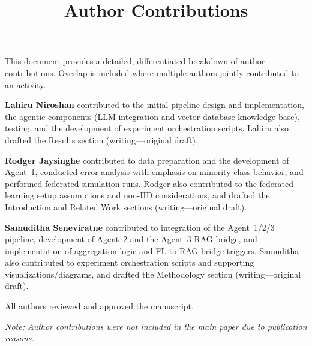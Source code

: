 \documentclass[11pt]{article}
\title{Author Contributions}
\date{}
\begin{document}
\maketitle

This document provides a detailed, differentiated breakdown of author contributions. Overlap is included where multiple authors jointly contributed to an activity.

\noindent\textbf{Lahiru Niroshan} contributed to the initial pipeline design and implementation, the agentic components (LLM integration and vector-database knowledge base), testing, and the development of experiment orchestration scripts. Lahiru also drafted the Results section (writing---original draft).

\vspace{0.25em}
\noindent\textbf{Rodger Jaysinghe} contributed to data preparation and the development of Agent~1, conducted error analysis with emphasis on minority-class behavior, and performed federated simulation runs. Rodger also contributed to the federated learning setup assumptions and non-IID considerations, and drafted the Introduction and Related Work sections (writing---original draft).

\vspace{0.25em}
\noindent\textbf{Samuditha Seneviratne} contributed to integration of the Agent~1/2/3 pipeline, development of Agent~2 and the Agent~3 RAG bridge, and implementation of aggregation logic and FL-to-RAG bridge triggers. Samuditha also contributed to experiment orchestration scripts and supporting visualizations/diagrams, and drafted the Methodology section (writing---original draft).

All authors reviewed and approved the manuscript.

\vspace{0.5em}
\noindent\textit{Note: Author contributions were not included in the main paper due to publication reasons.}
\end{document}
